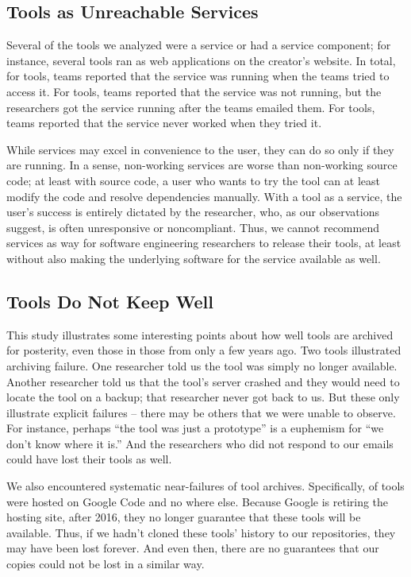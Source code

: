 \documentclass[10pt,conference]{IEEEtran}
\begin{document}
\subsection{Tools as Unreachable Services}

Several of the tools we analyzed were a service or had a
service component; for instance, several tools
ran as web applications on the creator's website.
In total, for \serviceRunning tools, teams 
reported that the service was running when the teams tried
to access it.
For \serviceRunningLater tools, teams reported that the service
was not running, but the researchers got the service running
after the teams emailed them.
For \serviceRunningNever tools, teams reported that the service
never worked when they tried it. 

While services may excel in convenience to the user, 
they can do so only if they are running.
In a sense, non-working services are worse than non-working source code;
at least with source code, a user who wants to try the tool can 
at least modify the code and resolve dependencies manually.
With a tool as a service, the user's success is entirely dictated
by the researcher, who, as our observations suggest, is often
unresponsive or noncompliant. 
Thus, we cannot recommend services as  way for software
engineering researchers to release their tools,
at least without also making the underlying software for 
the service available as well.  

\subsection{Tools Do Not Keep Well}

This study illustrates some interesting points about how well tools
are archived for posterity, even those in those from only a few years ago.
Two tools illustrated archiving failure.
One researcher told us the tool was simply no longer available.
Another researcher told us that the tool's server crashed and they
would need to locate the tool on a backup; that researcher never got back to us.
But these only illustrate explicit failures -- there may be others 
that we were unable to observe.
For instance, perhaps ``the tool was just a prototype'' is a euphemism for 
``we don't know where it is.''
And the researchers who did not respond to our emails 
could have lost their tools as well.

We also encountered systematic near-failures of tool archives.
Specifically, \onlineJustGcode of tools were hosted on Google Code
and no where else.
Because Google is retiring the hosting site, after 2016,
they no longer guarantee that these tools will be available.
Thus, if we hadn't cloned these tools' history to our repositories,
they may have been lost forever.
And even then, there are no guarantees that our copies could not be lost
in a similar way.
\end{document}
